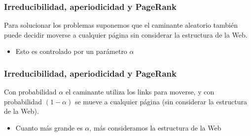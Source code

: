 \begin{frame}
\frametitle{Irreducibilidad, aperiodicidad y PageRank}

{\small

Para solucionar los problemas suponemos que el caminante aleatorio también puede decidir moverse a cualquier página sin considerar la estructura de la Web.
\begin{itemize}
\item Esto es controlado por un parámetro $\alpha$
\end{itemize}





}

\end{frame}



\begin{frame}
\frametitle{Irreducibilidad, aperiodicidad y PageRank}

{\small

Con probabilidad $\alpha$ el caminante utiliza los links para moverse, y con probabilidad $(1 - \alpha)$ se mueve a cualquier página (sin considerar la estructura de la Web).
\begin{itemize}
\item Cuanto más grande es $\alpha$, más consideramos la estructura de la Web
\end{itemize}



}


\end{frame}



